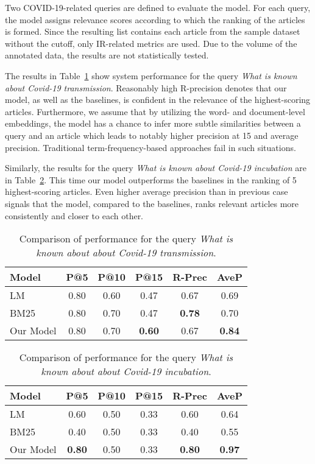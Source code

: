 \documentclass[10pt, a4paper]{article}
\begin{document}
Two COVID-19-related queries are defined to evaluate the model. For each query, the model assigns relevance scores according to which the ranking of the articles is formed. Since the resulting list contains each article from the sample dataset without the cutoff, only IR-related metrics are used. Due to the volume of the annotated data, the results are not statistically tested. 

The results in Table~\ref{tab:query1} show system performance for the query \emph{What is known about Covid-19 transmission}. Reasonably high R-precision denotes that our model, as well as the baselines, is confident in the relevance of the highest-scoring articles. Furthermore, we assume that by utilizing the word- and document-level embeddings, the model has a chance to infer more subtle similarities between a query and an article which leads to notably higher precision at 15 and average precision. Traditional term-frequency-based approaches fail in such situations.

Similarly, the results for the query \emph{What is known about Covid-19 incubation} are in Table~\ref{tab:query2}. This time our model outperforms the baselines in the ranking of 5 highest-scoring articles. Even higher average precision than in previous case signals that the model, compared to the baselines, ranks relevant articles more consistently and closer to each other.

\begin{table}
\caption{Comparison of performance for the query \emph{What is known about about Covid-19 transmission}.}
\label{tab:query1}
\begin{center}
\begin{tabular}{lccccc}
\toprule
Model & P@5 & P@10 & P@15 & R-Prec & AveP \\
\midrule
LM & 0.80 & 0.60 & 0.47 & 0.67 & 0.69  \\
BM25 & 0.80 & 0.70 & 0.47 & \textbf{0.78} & 0.70 \\
Our Model & 0.80 & 0.70 & \textbf{0.60} & 0.67 & \textbf{0.84} \\
\bottomrule
\end{tabular}
\end{center}
\end{table}

\begin{table}
\caption{Comparison of performance for the query \emph{What is known about about Covid-19 incubation}.}
\label{tab:query2}
\begin{center}
\begin{tabular}{lccccc}
\toprule
Model & P@5 & P@10 & P@15 & R-Prec & AveP \\
\midrule
LM & 0.60 & 0.50 & 0.33 & 0.60 & 0.64 \\
BM25 & 0.40 & 0.50 & 0.33 & 0.40 & 0.55 \\
Our Model & \textbf{0.80} & 0.50 & 0.33 & \textbf{0.80} & \textbf{0.97} \\
\bottomrule
\end{tabular}
\end{center}
\end{table}
\end{document}
